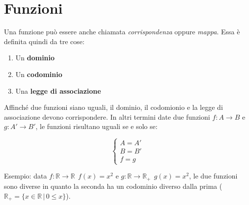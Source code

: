 \section{Funzioni} \label{funzioni}


Una funzione può essere anche chiamata \textit{corrispondenza} oppure \textit{mappa}. Essa è definita quindi da tre cose:
\begin{enumerate}
    \item Un \textbf{dominio}
    \item Un \textbf{codominio}
    \item Una \textbf{legge di associazione}
\end{enumerate}


Affinché due funzioni siano uguali, il dominio, il codomionio e la legge di associazione devono corrispondere. In altri termini date due funzioni $f: A \to B$ e $g: A' \to B'$, le funzioni risultano uguali se e solo se:

\begin{equation*}
    \begin{cases}
    A = A'\\
    B = B'\\
    f = g
    \end{cases}
\end{equation*}

Esempio: data $f: \mathbb{R} \to \mathbb{R}\;\, f(x) = x^2$ e $g: \mathbb{R} \to \mathbb{R}_{+}\;\, g(x) = x^2$, le due funzioni sono diverse in quanto la seconda ha un codominio diverso dalla prima ($\mathbb{R}_{+} = \{x \in \mathbb{R}\, |\, 0 \leq x\}$).\\

